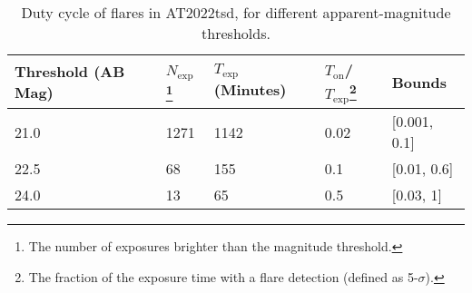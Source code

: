 \documentclass{nature_plusfigure}
\newcommand{\at}{AT2022tsd}
\begin{document}
\begin{extended_data}
\begin{center} 
\begin{longtable}{lllll} 
\caption{Duty cycle of flares in \at, for different apparent-magnitude thresholds.} 
\label{tab:flare-stats}\\ 
\hline\hline
Threshold (AB Mag) & $N_\mathrm{exp}$\footnote{The number of exposures brighter than the magnitude threshold.} & $T_\mathrm{exp}$ (Minutes) & $T_\mathrm{on}$/$T_\mathrm{exp}$\footnote{The fraction of the exposure time with a flare detection (defined as 5-$\sigma$).} & Bounds \\
\hline
21.0 & 1271 & 1142 & 0.02 & [0.001, 0.1] \\
22.5 & 68 & 155 & 0.1 & [0.01, 0.6]  \\
24.0 & 13 & 65 & 0.5 & [0.03, 1] \\
\hline \hline
\end{longtable}
\end{center}

\end{extended_data}

\clearpage
\end{document}
